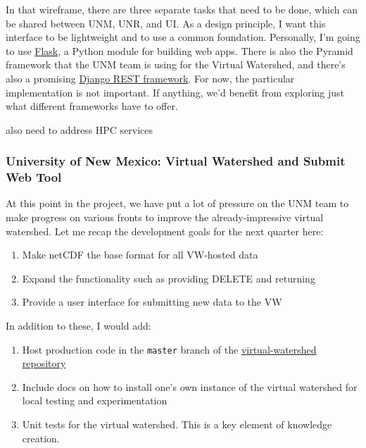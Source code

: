 \documentclass[
11pt, %
a4paper, %
oneside, %
twoside, %
headinclude,footinclude, %
BCOR5mm, %
]{scrartcl}
\begin{document}
In that wireframe, there are three separate tasks that need to be done, which can be shared
between UNM, UNR, and UI. As a design principle, I want this interface to be lightweight and to
use a common foundation. Personally, I'm going to use 
\href{http://flask.pocoo.org/docs/0.10/}{Flask}, a Python module for building web apps. There is
also the Pyramid framework that the UNM team is using for the Virtual Watershed, and there's 
also a promising \href{http://www.django-rest-framework.org/}{Django REST framework}. For now,
the particular implementation is not important. If anything, we'd benefit from exploring just what
different frameworks have to offer.

\large{also need to address HPC services}

\subsubsection{University of New Mexico: Virtual Watershed and Submit Web Tool} %
\label{ssub:UNM_webtool}

At this point in the project, we have put a lot of pressure on the UNM team to make progress
on various fronts to improve the already-impressive virtual watershed. Let me recap the 
development goals for the next quarter here:

\begin{enumerate}
    \item Make netCDF the base format for all VW-hosted data
    \item Expand the functionality such as providing DELETE and returning 
    \item Provide a user interface for submitting new data to the VW
\end{enumerate}

In addition to these, I would add:

\begin{enumerate}
    \item Host production code in the \texttt{master} branch of the \href{https://github.com/tri-state-epscor/virtual-watershed}{virtual-watershed repository}
    \item Include docs on how to install one's own instance of the virtual watershed for local 
        testing and experimentation
    \item Unit tests for the virtual watershed. This is a key element of knowledge creation.
\end{enumerate}

\end{document}
